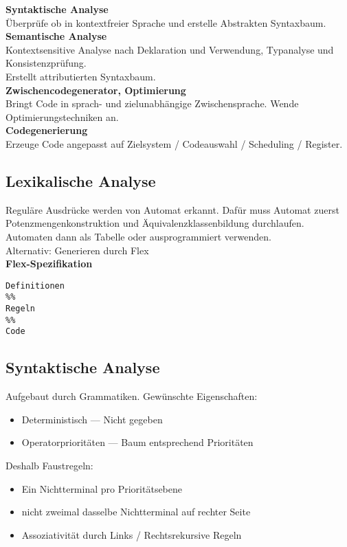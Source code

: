 \textbf{Syntaktische Analyse}\\
Überprüfe ob in kontextfreier Sprache und erstelle Abstrakten Syntaxbaum.\\

\textbf{Semantische Analyse}\\
Kontextsensitive Analyse nach Deklaration und Verwendung, Typanalyse und Konsistenzprüfung.\\
Erstellt attributierten Syntaxbaum.\\

\textbf{Zwischencodegenerator, Optimierung}\\
Bringt Code in sprach- und zielunabhängige Zwischensprache. Wende Optimierungstechniken an.\\

\textbf{Codegenerierung}\\
Erzeuge Code angepasst auf Zielsystem / Codeauswahl / Scheduling / Register.

\subsection{Lexikalische Analyse}
Reguläre Ausdrücke werden von Automat erkannt. Dafür muss Automat zuerst Potenzmengenkonstruktion und
Äquivalenzklassenbildung durchlaufen.\\
Automaten dann als Tabelle oder ausprogrammiert verwenden.\\
Alternativ: Generieren durch Flex\\

\textbf{Flex-Spezifikation}
\begin{lstlisting}
Definitionen
%%
Regeln
%%
Code
\end{lstlisting}

\subsection{Syntaktische Analyse}
Aufgebaut durch Grammatiken. Gewünschte Eigenschaften:
\begin{itemize}
  \item Deterministisch --- Nicht gegeben
  \item Operatorprioritäten --- Baum entsprechend Prioritäten
\end{itemize}
Deshalb Faustregeln:
\begin{itemize}
  \item Ein Nichtterminal pro Prioritätsebene
  \item nicht zweimal dasselbe Nichtterminal auf rechter Seite
  \item Assoziativität durch Links / Rechtsrekursive Regeln
\end{itemize}

